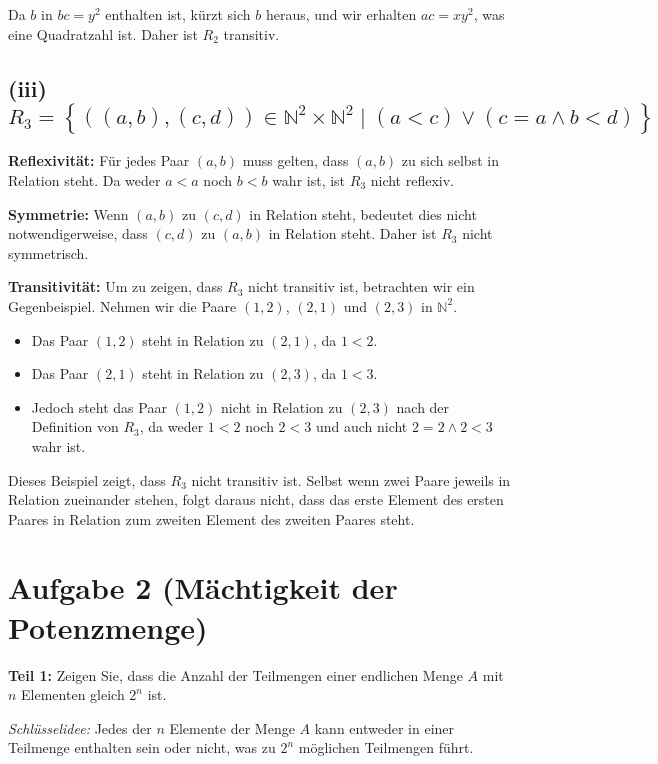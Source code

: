 \documentclass[12pt]{article}
\begin{document}
Da \( b \) in \( bc = y^2 \) enthalten ist, kürzt sich \( b \) heraus, und wir erhalten \( ac = xy^2 \), was eine Quadratzahl ist. Daher ist \( R_2 \) transitiv.

\subsection*{(iii) \(R_3 = \left\{ ((a, b), (c, d)) \in \mathbb{N}^2 \times \mathbb{N}^2 \mid (a < c) \lor (c = a \land b < d) \right\}\)}

\textbf{Reflexivität:} Für jedes Paar \((a, b)\) muss gelten, dass \((a, b)\) zu sich selbst in Relation steht. Da weder \(a < a\) noch \(b < b\) wahr ist, ist \(R_3\) nicht reflexiv.

\textbf{Symmetrie:} Wenn \((a, b)\) zu \((c, d)\) in Relation steht, bedeutet dies nicht notwendigerweise, dass \((c, d)\) zu \((a, b)\) in Relation steht. Daher ist \(R_3\) nicht symmetrisch.

\textbf{Transitivität:} Um zu zeigen, dass \( R_3 \) nicht transitiv ist, betrachten wir ein Gegenbeispiel. Nehmen wir die Paare \((1, 2)\), \((2, 1)\) und \((2, 3)\) in \( \mathbb{N}^2 \).

\begin{itemize}
	\item Das Paar \((1, 2)\) steht in Relation zu \((2, 1)\), da \(1 < 2\).
	\item Das Paar \((2, 1)\) steht in Relation zu \((2, 3)\), da \(1 < 3\).
	\item Jedoch steht das Paar \((1, 2)\) nicht in Relation zu \((2, 3)\) nach der Definition von \( R_3 \), da weder \(1 < 2\) noch \(2 < 3\) und auch nicht \(2 = 2 \land 2 < 3\) wahr ist.
\end{itemize}

Dieses Beispiel zeigt, dass \( R_3 \) nicht transitiv ist. Selbst wenn zwei Paare jeweils in Relation zueinander stehen, folgt daraus nicht, dass das erste Element des ersten Paares in Relation zum zweiten Element des zweiten Paares steht.

\section*{Aufgabe 2 (Mächtigkeit der Potenzmenge)}

\textbf{Teil 1:} Zeigen Sie, dass die Anzahl der Teilmengen einer endlichen Menge \( A \) mit \( n \) Elementen gleich \( 2^n \) ist.

\textit{Schlüsselidee:} Jedes der \( n \) Elemente der Menge \( A \) kann entweder in einer Teilmenge enthalten sein oder nicht, was zu \( 2^n \) möglichen Teilmengen führt.
\end{document}
